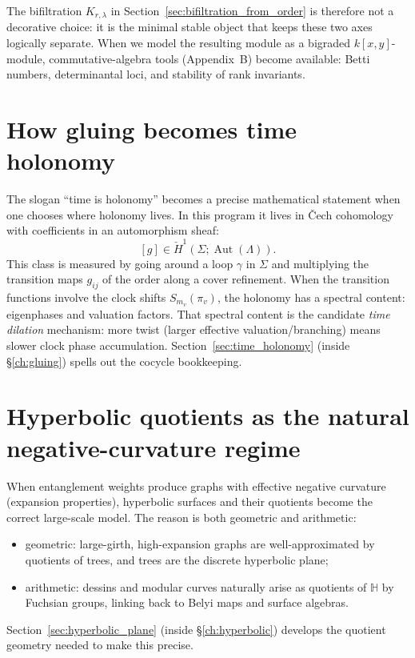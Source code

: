 \documentclass[11pt,oneside]{amsbook}
\numberwithin{equation}{section}
\theoremstyle{plain}
\theoremstyle{definition}
\theoremstyle{remark}
\newcommand{\HH}{\mathbb{H}}
\DeclareMathOperator{\Aut}{\mathrm{Aut}}
\begin{document}
The bifiltration $K_{r,\lambda}$ in Section~\ref{sec:bifiltration_from_order} is therefore not a decorative choice:
it is the minimal stable object that keeps these two axes logically separate.
When we model the resulting module as a bigraded $k[x,y]$-module, commutative-algebra tools (Appendix~B) become available:
Betti numbers, determinantal loci, and stability of rank invariants.

\section*{How gluing becomes time holonomy}
\label{sec:time_holonomy}

The slogan ``time is holonomy'' becomes a precise mathematical statement when one chooses where holonomy lives.
In this program it lives in \v{C}ech cohomology with coefficients in an automorphism sheaf:
\[
[g]\in \check{H}^1(\Sigma;\Aut(\Lambda)).
\]
This class is measured by going around a loop $\gamma$ in $\Sigma$ and multiplying the transition maps $g_{ij}$ of the order along a cover refinement.
When the transition functions involve the clock shifts $S_{m_v}(\pi_v)$, the holonomy has a spectral content: eigenphases and valuation factors.
That spectral content is the candidate \emph{time dilation} mechanism: more twist (larger effective valuation/branching) means slower clock phase accumulation.
Section~\ref{sec:time_holonomy} (inside \S\ref{ch:gluing}) spells out the cocycle bookkeeping.

\section*{Hyperbolic quotients as the natural negative-curvature regime}

When entanglement weights produce graphs with effective negative curvature (expansion properties),
hyperbolic surfaces and their quotients become the correct large-scale model.
The reason is both geometric and arithmetic:
\begin{itemize}
\item geometric: large-girth, high-expansion graphs are well-approximated by quotients of trees, and trees are the discrete hyperbolic plane;
\item arithmetic: dessins and modular curves naturally arise as quotients of $\HH$ by Fuchsian groups, linking back to Belyi maps and surface algebras.
\end{itemize}
Section~\ref{sec:hyperbolic_plane} (inside \S\ref{ch:hyperbolic}) develops the quotient geometry needed to make this precise.
\end{document}
